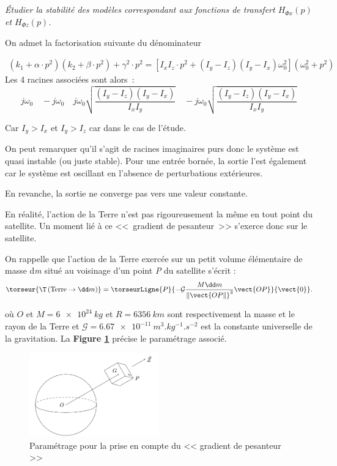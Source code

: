 \subparagraph{\label{q_10}}\textit{Étudier la stabilité des modèles correspondant aux fonctions de transfert $H_{\Phi x}(p)$ et $H_{\Phi z}(p)$.}
\ifprof
\begin{corrige}
On admet la factorisation suivante du dénominateur

\begin{align*}
\left(k_1+\alpha\cdot p^2\right)\left(k_2+\beta\cdot p^2\right)+\gamma^2\cdot p^2=\left[I_xI_z\cdot p^2+\left(I_y-I_z\right)\left(I_y-I_x\right)\omega_0^2\right]\left(\omega_0^2+p^2\right)
\end{align*}
%
%
Les 4 racines associées sont alors~: 
$$
j\omega_0
\quad
-j\omega_0
\quad
j\omega_0\sqrt{\dfrac{\left(I_y-I_z\right)\left(I_y-I_x\right)}{I_xI_y}}
\quad
-j\omega_0\sqrt{\dfrac{\left(I_y-I_z\right)\left(I_y-I_x\right)}{I_xI_y}}
$$


Car $I_y>I_x$ et $I_y>I_z$ car dans le cas de l'étude.

On peut remarquer qu'il s'agit de racines imaginaires purs donc le
système est quasi instable (ou juste stable). Pour une entrée bornée, la
sortie l'est également car le système est oscillant en l'absence de
perturbations extérieures.

En revanche, la sortie ne converge pas vers une valeur constante.

\end{corrige}
\else
\fi


\ifprof
\else
En réalité, l'action de la Terre n'est pas rigoureusement la même en
tout point du satellite. Un moment lié à ce <<~gradient de pesanteur~>> 
s'exerce donc sur le satellite.

On rappelle que l'action de la Terre exercée sur un petit volume
élémentaire de masse d\emph{m} situé au voisinage d'un point \emph{P} du
satellite s'écrit :
$$
\torseur{\T\left(\text{Terre}\to \dd m\right)}=\torseurLigne{P}{-\mathcal{G}\dfrac{M \dd m}{\Vert\vect{OP\Vert}^3}\vect{OP}}{\vect{0}}.
$$



où $O$ et $M = \SI{6e24}{kg}$ et $R = \SI{6356}{km}$
sont respectivement la masse et le rayon de la Terre et $\mathcal{G} =\SI{6,67e-11}{m^{3}.kg^{-1}.s^{-2}}$ est la
constante universelle de la gravitation. La \textbf{Figure \ref{fig5}} précise le paramétrage associé.


\begin{figure}[!htb]
\begin{center}
\includegraphics[width=0.5\textwidth]{images/images5.jpg}
\end{center}
\caption{Paramétrage pour la prise en compte du << gradient de pesanteur >> \label{fig5}}
\end{figure}

